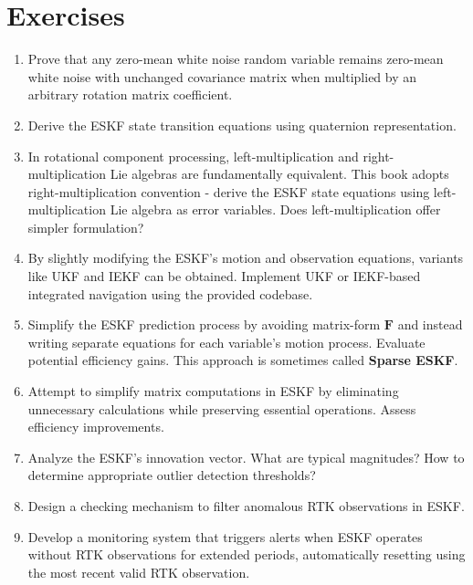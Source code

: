 \section*{Exercises}
\begin{enumerate}
\item Prove that any zero-mean white noise random variable remains zero-mean white noise with unchanged covariance matrix when multiplied by an arbitrary rotation matrix coefficient.

\item Derive the ESKF state transition equations using quaternion representation.

\item In rotational component processing, left-multiplication and right-multiplication Lie algebras are fundamentally equivalent. This book adopts right-multiplication convention - derive the ESKF state equations using left-multiplication Lie algebra as error variables. Does left-multiplication offer simpler formulation?

\item By slightly modifying the ESKF's motion and observation equations, variants like UKF and IEKF can be obtained. Implement UKF or IEKF-based integrated navigation using the provided codebase.

\item Simplify the ESKF prediction process by avoiding matrix-form $\mathbf{F}$ and instead writing separate equations for each variable's motion process. Evaluate potential efficiency gains. This approach is sometimes called \textbf{Sparse ESKF}.

\item Attempt to simplify matrix computations in ESKF by eliminating unnecessary calculations while preserving essential operations. Assess efficiency improvements.

\item Analyze the ESKF's innovation vector. What are typical magnitudes? How to determine appropriate outlier detection thresholds?

\item Design a checking mechanism to filter anomalous RTK observations in ESKF.

\item Develop a monitoring system that triggers alerts when ESKF operates without RTK observations for extended periods, automatically resetting using the most recent valid RTK observation.
\end{enumerate}